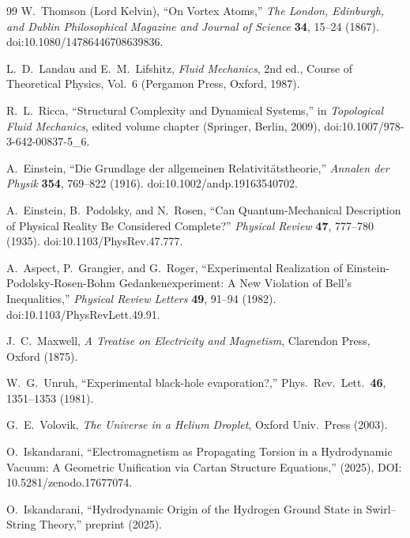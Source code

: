 \documentclass[10pt,reprint,aps,onecolumn,nofootinbib]{revtex4-2}
\begin{document}
\begin{thebibliography}{99}
        W.~Thomson (Lord Kelvin),
        ``On Vortex Atoms,''
        \textit{The London, Edinburgh, and Dublin Philosophical Magazine and Journal of Science} \textbf{34}, 15--24 (1867).
        doi:10.1080/14786446708639836.

        L.~D.~Landau and E.~M.~Lifshitz,
        \textit{Fluid Mechanics}, 2nd ed.,
        Course of Theoretical Physics, Vol.~6
        (Pergamon Press, Oxford, 1987).

        R.~L.~Ricca,
        ``Structural Complexity and Dynamical Systems,''
        in \textit{Topological Fluid Mechanics}, edited volume chapter (Springer, Berlin, 2009),
        doi:10.1007/978-3-642-00837-5\_6.

    A.~Einstein,
    ``Die Grundlage der allgemeinen Relativitätstheorie,''
    \textit{Annalen der Physik} \textbf{354}, 769--822 (1916).
    doi:10.1002/andp.19163540702.

    A.~Einstein, B.~Podolsky, and N.~Rosen,
    ``Can Quantum-Mechanical Description of Physical Reality Be Considered Complete?''
    \textit{Physical Review} \textbf{47}, 777--780 (1935).
    doi:10.1103/PhysRev.47.777.

    A.~Aspect, P.~Grangier, and G.~Roger,
    ``Experimental Realization of Einstein-Podolsky-Rosen-Bohm Gedankenexperiment:
    A New Violation of Bell's Inequalities,''
    \textit{Physical Review Letters} \textbf{49}, 91--94 (1982).
    doi:10.1103/PhysRevLett.49.91.

    J.~C.~Maxwell, \emph{A Treatise on Electricity and Magnetism},
    Clarendon Press, Oxford (1875).

    W.~G.~Unruh, ``Experimental black-hole evaporation?,''
    Phys.\ Rev.\ Lett.\ \textbf{46}, 1351--1353 (1981).

    G.~E.~Volovik, \emph{The Universe in a Helium Droplet},
    Oxford Univ.\ Press (2003).

    O.~Iskandarani, ``Electromagnetism as Propagating Torsion in a Hydrodynamic Vacuum: A Geometric Unification via Cartan Structure Equations,''
    (2025), DOI: 10.5281/zenodo.17677074.

    O.~Iskandarani, ``Hydrodynamic Origin of the Hydrogen Ground State in Swirl--String Theory,''
    preprint (2025).


\end{thebibliography}
\end{document}
